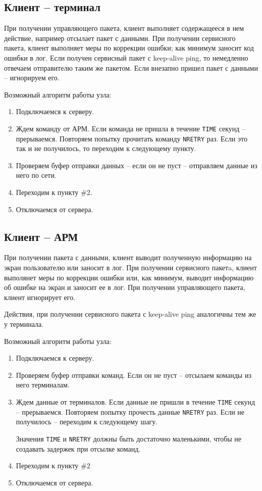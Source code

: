 \documentclass[a4paper,12pt]{report}
\begin{document}
\subsection*{Клиент -- терминал}
При получении управляющего пакета, клиент выполняет содержащееся в нем действие, например отсылает пакет с данными. 
При получении сервисного пакета, клиент выполняет меры по коррекции ошибки; как минимум заносит код ошибки в лог. Если 
получен сервисный пакет с keep-alive ping, то немедленно отвечаем отправителю таким же пакетом. Если внезапно пришел пакет с 
данными -- игнорируем его.

Возможный алгоритм работы узла:
\begin{enumerate}
\item Подключаемся к серверу.
\item Ждем команду от АРМ. Если команда не пришла в течение \texttt{TIME} секунд -- прерываемся. Повторяем попытку 
прочитать команду \texttt{NRETRY} раз. Если это так и не получилось, то переходим к следующему пункту.
\item Проверяем буфер отправки данных -- если он не пуст -- отправляем данные из него по сети.
\item Переходим к пункту \#2.
\item Отключаемся от сервера.
\end{enumerate}

\subsection*{Клиент -- АРМ}
При получении пакета с данными, клиент выводит полученную информацию на экран пользователю или заносит в лог. 
При получении сервисного пакетa, клиент выполянет меры по коррекции ошибки или, как минимум, выводит информацию об 
ошибке на экран и заносит ее в лог. При получении управляющего пакета, клиент игнорирует его.

Действия, при получении сервисного пакета с keep-alive ping аналогичны тем же у терминала.

Возможный алгоритм работы узла:
\begin{enumerate}
\item Подключаемся к серверу.
\item Проверяем буфер отправки команд. Если он не пуст -- отсылаем команды из него терминалам.
\item Ждем данные от терминалов. Если данные не пришли в течение \texttt{TIME} секунд -- прерываемся. 
Повторяем попытку прочесть данные \texttt{NRETRY} раз. Если не получилось -- переходим к следующему шагу.

Значения \texttt{TIME} и \texttt{NRETRY} должны быть достаточно маленькими, чтобы не создавать задержек при 
отсылке команд.
\item Переходим к пункту \#2
\item Отключаемся от сервера.
\end{enumerate}
\end{document}

